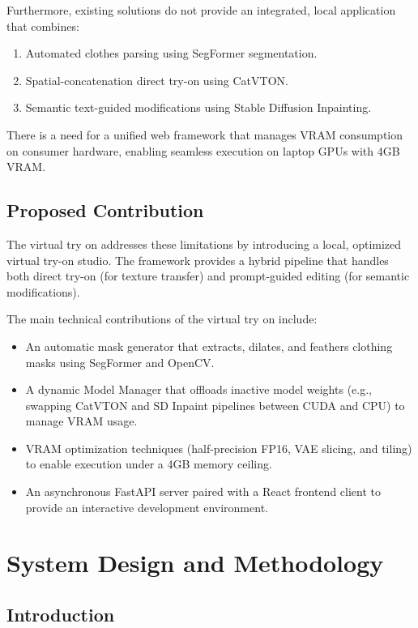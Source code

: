 \documentclass[12pt, a4paper]{report}
\begin{document}
Furthermore, existing solutions do not provide an integrated, local application that combines:
\begin{enumerate}
\item Automated clothes parsing using SegFormer segmentation.
\item Spatial-concatenation direct try-on using CatVTON.
\item Semantic text-guided modifications using Stable Diffusion Inpainting.
\end{enumerate}
There is a need for a unified web framework that manages VRAM consumption on consumer hardware, enabling seamless execution on laptop GPUs with 4GB VRAM.

\section{Proposed Contribution}

The virtual try on addresses these limitations by introducing a local, optimized virtual try-on studio. The framework provides a hybrid pipeline that handles both direct try-on (for texture transfer) and prompt-guided editing (for semantic modifications).

The main technical contributions of the virtual try on include:
\begin{itemize}
\item An automatic mask generator that extracts, dilates, and feathers clothing masks using SegFormer and OpenCV.
\item A dynamic Model Manager that offloads inactive model weights (e.g., swapping CatVTON and SD Inpaint pipelines between CUDA and CPU) to manage VRAM usage.
\item VRAM optimization techniques (half-precision FP16, VAE slicing, and tiling) to enable execution under a 4GB memory ceiling.
\item An asynchronous FastAPI server paired with a React frontend client to provide an interactive development environment.
\end{itemize}

\chapter{System Design and Methodology}

\section{Introduction}
\end{document}

